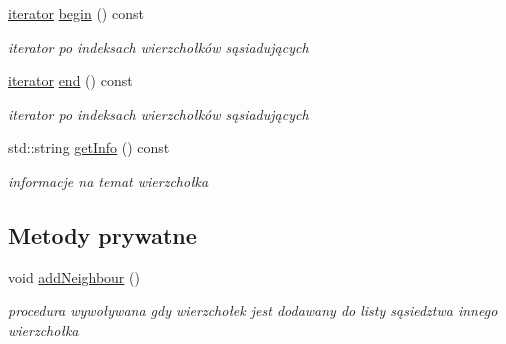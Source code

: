 \begin{DoxyCompactItemize}
\hyperlink{classVertex_ac889dee153c9abe7b3fb652ec6583df9}{iterator} \hyperlink{classVertex_afe907b35d105ae302e53bbd0416e2af7}{begin} () const 
\begin{DoxyCompactList}\small\item\em iterator po indeksach wierzchołków sąsiadujących \end{DoxyCompactList}\item 
\hyperlink{classVertex_ac889dee153c9abe7b3fb652ec6583df9}{iterator} \hyperlink{classVertex_a8e7eadc2393bd0706e4189e83e2ea6e5}{end} () const 
\begin{DoxyCompactList}\small\item\em iterator po indeksach wierzchołków sąsiadujących \end{DoxyCompactList}\item 
std\-::string \hyperlink{classVertex_a8134949da7cd56815688c6a2d0b4d9f9}{get\-Info} () const 
\begin{DoxyCompactList}\small\item\em informacje na temat wierzchołka \end{DoxyCompactList}\end{DoxyCompactItemize}
\subsection*{Metody prywatne}
\begin{DoxyCompactItemize}
\item 
void \hyperlink{classVertex_a144482cc091abe9c30061f987d0596f7}{add\-Neighbour} ()
\begin{DoxyCompactList}\small\item\em procedura wywoływana gdy wierzchołek jest dodawany do listy sąsiedztwa innego wierzchołka \end{DoxyCompactList}\end{DoxyCompactItemize}
